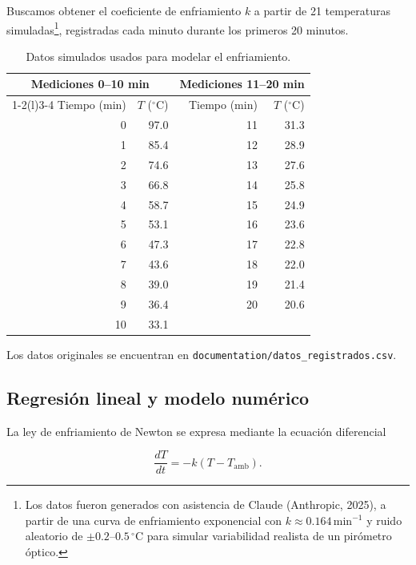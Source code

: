 \documentclass[11pt,onecolumn,letterpaper]{article}
\newcommand{\Tamb}{T_{\mathrm{amb}}}
\begin{document}
Buscamos obtener el coeficiente de enfriamiento \(k\) a partir de 21 temperaturas
simuladas\footnote{Los datos fueron generados con asistencia de Claude
(Anthropic, 2025), a partir de una curva de enfriamiento exponencial con
\(k \approx 0.164\,\text{min}^{-1}\) y ruido aleatorio de \(\pm 0.2\)–\(0.5\,^{\circ}\mathrm{C}\)
para simular variabilidad realista de un pirómetro óptico.}, registradas cada
minuto durante los primeros 20 minutos.

\begin{table}[H]
    \centering
    \caption{Datos simulados usados para modelar el enfriamiento.}
    \label{tab:datos}
    \begin{tabular}{@{}rr@{\hspace{2.1cm}}rr@{}}
        \toprule
        \multicolumn{2}{c}{Mediciones 0--10 min} & \multicolumn{2}{c}{Mediciones 11--20 min} \\
        \cmidrule(r){1-2}\cmidrule(l){3-4}
        Tiempo (min) & \(T\) (\(^{\circ}\mathrm{C}\)) & Tiempo (min) & \(T\) (\(^{\circ}\mathrm{C}\)) \\
        \midrule
         0 & 97.0 & 11 & 31.3 \\
         1 & 85.4 & 12 & 28.9 \\
         2 & 74.6 & 13 & 27.6 \\
         3 & 66.8 & 14 & 25.8 \\
         4 & 58.7 & 15 & 24.9 \\
         5 & 53.1 & 16 & 23.6 \\
         6 & 47.3 & 17 & 22.8 \\
         7 & 43.6 & 18 & 22.0 \\
         8 & 39.0 & 19 & 21.4 \\
         9 & 36.4 & 20 & 20.6 \\
        10 & 33.1 &    &      \\
        \bottomrule
    \end{tabular}
\end{table}

Los datos originales se encuentran en \texttt{documentation/datos\_registrados.csv}.

\subsection{Regresión lineal y modelo numérico}

La ley de enfriamiento de Newton se expresa mediante la ecuación diferencial

\begin{equation}
    \frac{dT}{dt}=-k\left(T-\Tamb\right).
    \label{eq:newton}
\end{equation}
\end{document}

